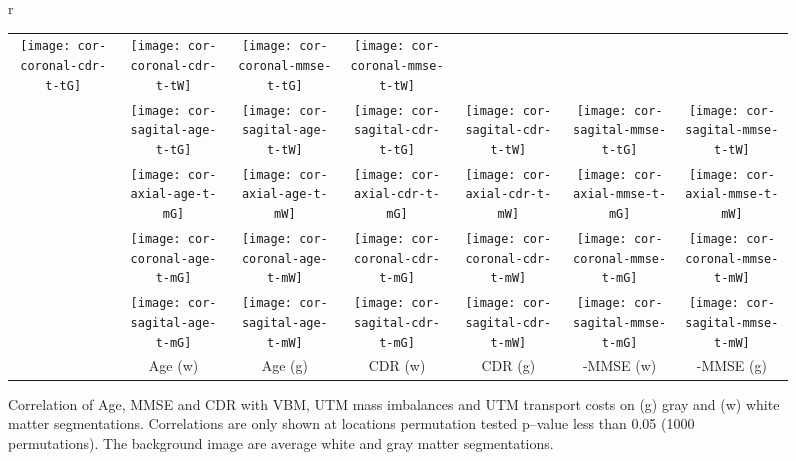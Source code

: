 \documentclass{llncs}
\begin{document}
\begin{figure}[!h]
\begin{tabular}{r}
\begin{tabular}{c|cc||cc||cc}
\texttt{[image: cor-coronal-cdr-t-tG]} &
\texttt{[image: cor-coronal-cdr-t-tW]} &
\texttt{[image: cor-coronal-mmse-t-tG]} &
\texttt{[image: cor-coronal-mmse-t-tW]} \\ 
&
\texttt{[image: cor-sagital-age-t-tG]} &
\texttt{[image: cor-sagital-age-t-tW]} &
\texttt{[image: cor-sagital-cdr-t-tG]} &
\texttt{[image: cor-sagital-cdr-t-tW]} &
\texttt{[image: cor-sagital-mmse-t-tG]} &
\texttt{[image: cor-sagital-mmse-t-tW]} \\ 
  \hline 
  \hline
  \raisebox{1mm}{ \multirow{3}{4mm}{ \rotatebox[origin=c]{90}{UTM Mass Allocation} }} &
\texttt{[image: cor-axial-age-t-mG]} &
\texttt{[image: cor-axial-age-t-mW]} &
\texttt{[image: cor-axial-cdr-t-mG]} &
\texttt{[image: cor-axial-cdr-t-mW]} &
\texttt{[image: cor-axial-mmse-t-mG]} &
\texttt{[image: cor-axial-mmse-t-mW]} \\ 
        &
\texttt{[image: cor-coronal-age-t-mG]} &
\texttt{[image: cor-coronal-age-t-mW]} &
\texttt{[image: cor-coronal-cdr-t-mG]} &
\texttt{[image: cor-coronal-cdr-t-mW]} &
\texttt{[image: cor-coronal-mmse-t-mG]} &
\texttt{[image: cor-coronal-mmse-t-mW]} \\ 
        &
\texttt{[image: cor-sagital-age-t-mG]} &
\texttt{[image: cor-sagital-age-t-mW]} &
\texttt{[image: cor-sagital-cdr-t-mG]} &
\texttt{[image: cor-sagital-cdr-t-mW]} &
\texttt{[image: cor-sagital-mmse-t-mG]} &
\texttt{[image: cor-sagital-mmse-t-mW]} \\ 

\hline \hline
& \parbox[b][3mm]{12mm}{Age (w)} 
& \parbox[b][3mm]{12mm}{Age (g)} 
& \parbox[b][3mm]{15mm}{CDR (w)} 
& \parbox[b][3mm]{15mm}{CDR (g) }
& \parbox[b][3mm]{15mm}{-MMSE (w)}
& \parbox[b][3mm]{15mm}{-MMSE (g)}
\end{tabular}
\end{tabular}
\caption{\label{fig:cor-oasis}
Correlation of Age, MMSE and CDR with VBM, UTM mass imbalances and UTM
transport costs on (g) gray and (w) white matter segmentations.  Correlations
are only shown at locations permutation tested p--value less than 0.05 (1000
permutations). The background image are average white and gray matter
segmentations.
\vspace{-4.5mm}
} 
\end{figure} \endgroup
\end{document}
